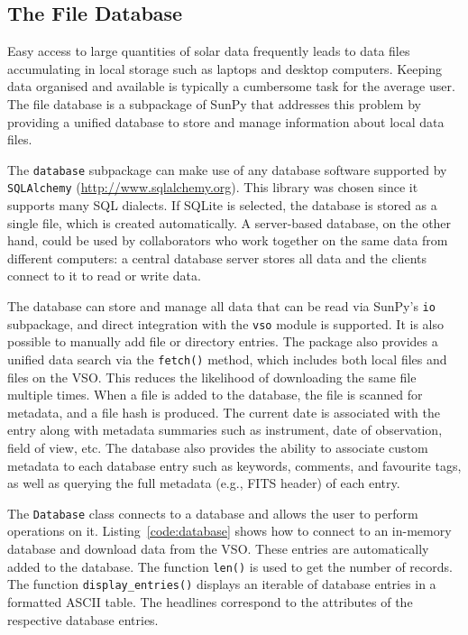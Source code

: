 \subsection{The File Database}\label{ssec:db}

Easy access to large quantities of solar data frequently leads to data files accumulating
in local storage such as laptops and desktop computers. Keeping data organised and available
is typically a cumbersome task for the average user. The file database is a subpackage of 
SunPy that addresses this problem by providing a unified database to store and 
manage information about local data files.

The \texttt{database} subpackage can make use of any database software supported by
\texttt{SQLAlchemy} (\url{http://www.sqlalchemy.org}). This library was chosen
since it supports many SQL dialects. 
If SQLite is selected, the database is stored as a single file, which is
created automatically. A server-based database, on the other hand, could be used
by collaborators who work together on the
same data from different computers: a central database server stores all data and the clients connect to
it to read or write data.

The database can store and manage all data that can be read via SunPy's 
\texttt{io} subpackage, and direct integration with the \texttt{vso} 
module is supported.
It is also possible to manually add file or directory entries. The package also provides
a unified data search via the \texttt{fetch()} method, which includes both local files
and files on the \textsc{VSO}. This reduces the likelihood of downloading the same file 
multiple times. When a file is added to the database, the file is scanned for metadata,
and a file hash is produced. 
The current date is associated with the entry along with metadata summaries such 
as instrument, date of observation, field of view, etc. 
The database also provides the ability to associate custom metadata to 
each database entry such as keywords, comments, and favourite tags, as well as 
querying the full metadata (e.g., FITS header) of each entry.

The \texttt{Database} class connects to a database and allows the user to 
perform operations on it. Listing~\ref{code:database} shows how to connect
to an in-memory database and download data from the \textsc{VSO}. These entries are
automatically added to the database. The function \texttt{len()} is used to get the number of
records. The function \texttt{display\_entries()} displays an iterable of 
database entries in a formatted \textsc{ASCII} table. The headlines 
correspond to the attributes of the respective database entries.

